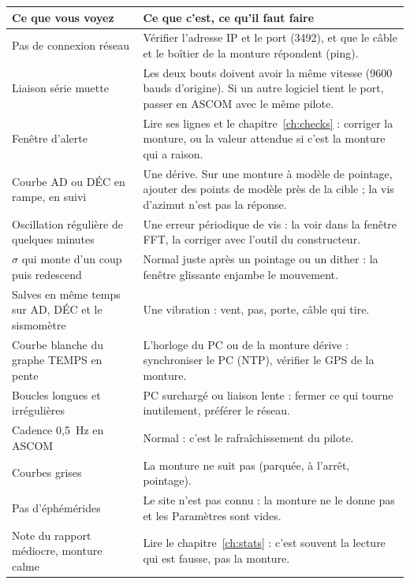 \begin{center}
\begin{tabularx}{\textwidth}{p{4cm}X}
\toprule
\textbf{Ce que vous voyez} & \textbf{Ce que c'est, ce qu'il faut faire} \\
\midrule
Pas de connexion réseau & Vérifier l'adresse IP et le port (3492), et que le
câble et le boîtier de la monture répondent (ping). \\
Liaison série muette & Les deux bouts doivent avoir la même vitesse (9600 bauds
d'origine). Si un autre logiciel tient le port, passer en ASCOM avec le même
pilote. \\
Fenêtre d'alerte & Lire ses lignes et le chapitre~\ref{ch:checks} : corriger
la monture, ou la valeur attendue si c'est la monture qui a raison. \\
Courbe AD ou DÉC en rampe, en suivi & Une dérive. Sur une monture à modèle de
pointage, ajouter des points de modèle près de la cible ; la vis d'azimut n'est
pas la réponse. \\
Oscillation régulière de quelques minutes & Une erreur périodique de vis : la
voir dans la fenêtre FFT, la corriger avec l'outil du constructeur. \\
$\sigma$ qui monte d'un coup puis redescend & Normal juste après un pointage ou un
dither : la fenêtre glissante enjambe le mouvement. \\
Salves en même temps sur AD, DÉC et le sismomètre & Une vibration : vent, pas,
porte, câble qui tire. \\
Courbe blanche du graphe TEMPS en pente & L'horloge du PC ou de la monture
dérive : synchroniser le PC (NTP), vérifier le GPS de la monture. \\
Boucles longues et irrégulières & PC surchargé ou liaison lente : fermer ce qui
tourne inutilement, préférer le réseau. \\
Cadence 0,5~Hz en ASCOM & Normal : c'est le rafraîchissement du pilote. \\
Courbes grises & La monture ne suit pas (parquée, à l'arrêt, pointage). \\
Pas d'éphémérides & Le site n'est pas connu : la monture ne le donne pas et
les Paramètres sont vides. \\
Note du rapport médiocre, monture calme & Lire le chapitre~\ref{ch:stats} :
c'est souvent la lecture qui est fausse, pas la monture. \\
\bottomrule
\end{tabularx}
\end{center}

